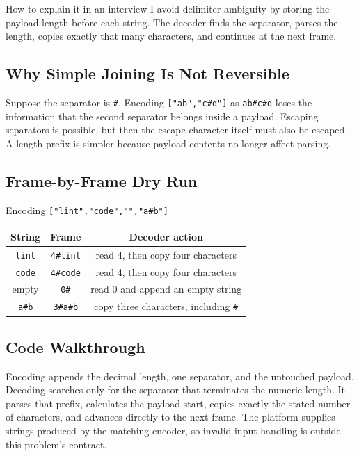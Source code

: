 \begin{revisionbox}{How to explain it in an interview}
I avoid delimiter ambiguity by storing the payload length before each string.
The decoder finds the separator, parses the length, copies exactly that many
characters, and continues at the next frame.
\end{revisionbox}

\subsection{Why Simple Joining Is Not Reversible}
Suppose the separator is \texttt{\#}. Encoding
\texttt{["ab","c\#d"]} as \texttt{ab\#c\#d} loses the information that the
second separator belongs inside a payload. Escaping separators is possible,
but then the escape character itself must also be escaped. A length prefix is
simpler because payload contents no longer affect parsing.

\subsection{Frame-by-Frame Dry Run}
\begin{dryrunbox}{Encoding \texttt{["lint","code","","a\#b"]}}
\begin{center}
\begin{tabular}{@{}c c c@{}}
\toprule
String & Frame & Decoder action \\
\midrule
\texttt{lint} & \texttt{4\#lint} & read 4, then copy four characters \\
\texttt{code} & \texttt{4\#code} & read 4, then copy four characters \\
empty & \texttt{0\#} & read 0 and append an empty string \\
\texttt{a\#b} & \texttt{3\#a\#b} & copy three characters, including \texttt{\#} \\
\bottomrule
\end{tabular}
\end{center}
\end{dryrunbox}

\subsection{Code Walkthrough}
Encoding appends the decimal length, one separator, and the untouched payload.
Decoding searches only for the separator that terminates the numeric length.
It parses that prefix, calculates the payload start, copies exactly the stated
number of characters, and advances directly to the next frame. The platform
supplies strings produced by the matching encoder, so invalid input handling
is outside this problem's contract.


